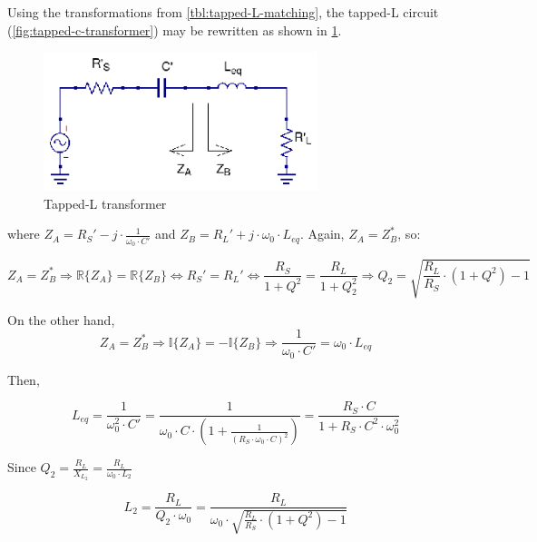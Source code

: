 \noindent Using the transformations from \ref{tbl:tapped-L-matching}, the tapped-L circuit (\ref{fig:tapped-c-transformer}) may be rewritten as shown in \ref{fig:tapped-c-transformer-equivalent}.

\begin{figure}[H]
\centering
\includegraphics[width=80mm]{Tapped-L-equivalent}
\caption{Tapped-L transformer}
\label{fig:tapped-c-transformer-equivalent}
\end{figure}

\noindent where $Z_A = R_S' - j \cdot \frac{1}{\omega_0 \cdot C'}$ and $Z_B = R_L' + j \cdot \omega_0 \cdot L_{eq}$. Again, $Z_A = Z_B^*$, so:

\begin{equation}
Z_A = Z_B^* \Longrightarrow \mathbb{R} \lbrace Z_A \rbrace  = \mathbb{R} \lbrace Z_B \rbrace \Longleftrightarrow R_S' = R_L' \Longleftrightarrow \frac{R_S}{1 + Q^2} = \frac{R_L}{1 + Q_2^2} \Longrightarrow Q_2 = \sqrt{\frac{R_L}{R_S} \cdot (1 + Q^2) - 1}
\end{equation}

\noindent On the other hand,
\begin{equation}
Z_A = Z_B^* \Longrightarrow \mathbb{I} \lbrace Z_A \rbrace  = -\mathbb{I} \lbrace Z_B \rbrace \Longrightarrow \frac{1}{\omega_0 \cdot C'} = \omega_0 \cdot L_{eq}
\end{equation}

\noindent Then,

\begin{equation}
L_{eq} = \frac{1}{\omega_0^2 \cdot C'} = \frac{1}{\omega_0 \cdot C \cdot \left( 1 + \frac{1}{(R_S \cdot \omega_0 \cdot C)^2}\right)} = \frac{R_S \cdot C}{1 + R_S \cdot C^2 \cdot \omega_0^2}
\end{equation}

\noindent Since $Q_2 = \frac{R_L}{X_{L_2}} = \frac{R_L}{\omega_0 \cdot L_2}$

\begin{equation}
L_2 = \frac{R_L}{Q_2 \cdot \omega_0} = \frac{R_L}{\omega_0 \cdot \sqrt{\frac{R_L}{R_S} \cdot (1 + Q^2) - 1}}
\end{equation}

